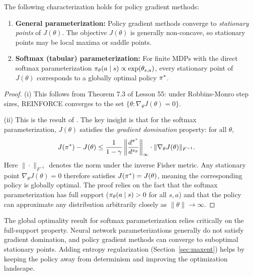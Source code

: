 \documentclass[11pt,a4paper]{article}
\begin{document}
\begin{theorem}
\label{thm:global-optimality}
The following characterization holds for policy gradient methods:
\begin{enumerate}[label=(\roman*)]
  \item \textbf{General parameterization:} Policy gradient methods
    converge to \emph{stationary points} of $J(\theta)$. The objective
    $J(\theta)$ is generally non-concave, so stationary points may be
    local maxima or saddle points.
  \item \textbf{Softmax (tabular) parameterization:} For finite MDPs
    with the direct softmax parameterization
    $\pi_\theta(a \mid s) \propto \exp(\theta_{s,a})$, every
    stationary point of $J(\theta)$ corresponds to a globally optimal
    policy $\pi^*$.
\end{enumerate}
\end{theorem}

\begin{proof}
(i) This follows from Theorem 7.3 of Lesson 55: under Robbins-Monro
step sizes, REINFORCE converges to the set
$\{\theta : \nabla_\theta J(\theta) = 0\}$.

(ii) This is the result of \citet{mei2020}. The key insight is that
for the softmax parameterization, $J(\theta)$ satisfies the
\emph{gradient domination} property: for all $\theta$,
\[
  J(\pi^*) - J(\theta) \leq \frac{1}{1-\gamma}
  \left\|\frac{d^{\pi^*}}{d^{\pi_\theta}}\right\|_\infty
  \cdot \|\nabla_\theta J(\theta)\|_{F^{-1}}.
\]
Here $\|\cdot\|_{F^{-1}}$ denotes the norm under the inverse Fisher
metric. Any stationary point $\nabla_\theta J(\theta) = 0$ therefore
satisfies $J(\pi^*) = J(\theta)$, meaning the corresponding
policy is globally optimal. The proof relies on the fact that the
softmax parameterization has full support ($\pi_\theta(a \mid s)
> 0$ for all $s, a$) and that the policy can approximate any
distribution arbitrarily closely as $\|\theta\| \to \infty$.
\end{proof}

\begin{warning}[title={Global Optimality Requires Full Support}]
The global optimality result for softmax parameterization relies
critically on the full-support property. Neural network
parameterizations generally do not satisfy gradient domination, and
policy gradient methods can converge to suboptimal stationary points.
Adding entropy regularization (Section~\ref{sec:maxent}) helps by
keeping the policy away from determinism and improving the optimization
landscape.
\end{warning}
\end{document}
